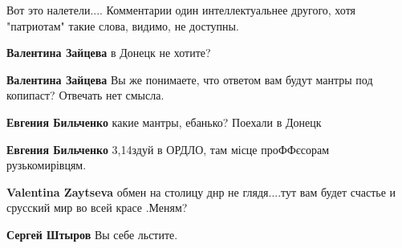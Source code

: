 \begin{itemize}

Вот это налетели.... Комментарии один интеллектуальнее другого, хотя
"патриотам" такие слова, видимо, не доступны.

\begin{itemize}
 
\textbf{Валентина Зайцева} в Донецк не хотите?

 
\textbf{Валентина Зайцева} Вы же понимаете, что ответом вам будут мантры под копипаст? Отвечать нет смысла.

 
\textbf{Евгения Бильченко} какие мантры, ебанько? Поехали в Донецк

 
\textbf{Евгения Бильченко}
3,14здуй в ОРДЛО, там місце проФФєсорам рузькомирівцям.

 
\textbf{Valentina Zaytseva} обмен на столицу днр не глядя....тут вам будет счастье и срусский мир во всей красе .Меням?

 
\textbf{Сергей Штыров} Вы себе льстите.
\end{itemize}



\end{itemize}
